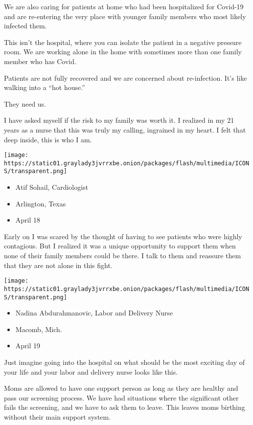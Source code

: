 We are also caring for patients at home who had been hospitalized for
Covid-19 and are re-entering the very place with younger family members
who most likely infected them.

This isn't the hospital, where you can isolate the patient in a negative
pressure room. We are working alone in the home with sometimes more than
one family member who has Covid.

Patients are not fully recovered and we are concerned about
re-infection. It's like walking into a ``hot house.''

They need us.

I have asked myself if the risk to my family was worth it. I realized in
my 21 years as a nurse that this was truly my calling, ingrained in my
heart. I felt that deep inside, this is who I am.

\texttt{[image: https://static01.graylady3jvrrxbe.onion/packages/flash/multimedia/ICONS/transparent.png]}

\begin{itemize}
\tightlist
\item
  Atif Sohail, Cardiologist
\item
  Arlington, Texas
\item
  April 18
\end{itemize}

Early on I was scared by the thought of having to see patients who were
highly contagious. But I realized it was a unique opportunity to support
them when none of their family members could be there. I talk to them
and reassure them that they are not alone in this fight.

\texttt{[image: https://static01.graylady3jvrrxbe.onion/packages/flash/multimedia/ICONS/transparent.png]}

\begin{itemize}
\tightlist
\item
  Nadina Abdurahmanovic, Labor and Delivery Nurse
\item
  Macomb, Mich.
\item
  April 19
\end{itemize}

Just imagine going into the hospital on what should be the most exciting
day of your life and your labor and delivery nurse looks like this.

Moms are allowed to have one support person as long as they are healthy
and pass our screening process. We have had situations where the
significant other fails the screening, and we have to ask them to leave.
This leaves moms birthing without their main support system.

